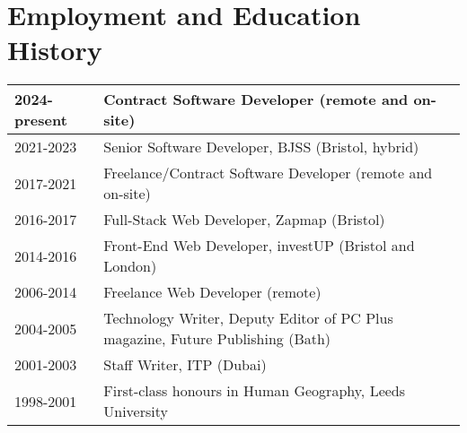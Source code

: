 \documentclass[a4paper,10pt]{article}
\newcommand{\resumeHeading}[1]{
  \section*{#1}
}
\begin{document}
  \begin{minipage}{\textwidth}
    \resumeHeading{Employment and Education History}

    \begingroup
      \setlength{\tabcolsep}{6pt}
      \renewcommand{\arraystretch}{1.2}  %
      \setlength{\arrayrulewidth}{0.1pt} %
      \begin{tabular*}{\textwidth}{l|l@{\extracolsep{\fill}}}
        \small{2024-present} & \small{Contract Software Developer (remote and on-site)} \\ \hline
        \small{2021-2023} & \small{Senior Software Developer, BJSS (Bristol, hybrid)} \\ \hline
        \small{2017-2021} & \small{Freelance/Contract Software Developer (remote and on-site)} \\ \hline
        \small{2016-2017} & \small{Full-Stack Web Developer, Zapmap (Bristol)} \\ \hline
        \small{2014-2016} & \small{Front-End Web Developer, investUP (Bristol and London)} \\ \hline
        \small{2006-2014} & \small{Freelance Web Developer (remote)} \\ \hline
        \small{2004-2005} & \small{Technology Writer, Deputy Editor of PC Plus magazine, Future Publishing (Bath)} \\ \hline
        \small{2001-2003} & \small{Staff Writer, ITP (Dubai)} \\ \hline
        \small{1998-2001} & \small{First-class honours in Human Geography, Leeds University}
      \end{tabular*}
    \endgroup
  \end{minipage}
\end{document}
